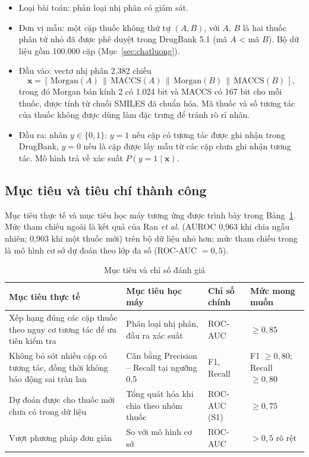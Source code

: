 \documentclass[12pt,a4paper,oneside]{report}
\begin{document}
\begin{itemize}
  \item Loại bài toán: phân loại nhị phân có giám sát.
  \item Đơn vị mẫu: một cặp thuốc không thứ tự $(A, B)$, với $A$, $B$ là hai
        thuốc phân tử nhỏ đã được phê duyệt trong DrugBank 5.1 (mã $A$ < mã $B$).
        Bộ dữ liệu gồm 100.000 cặp (Mục~\ref{sec:chatluong}).
  \item Đầu vào: vectơ nhị phân 2.382 chiều
        \[\mathbf{x} = [\,\text{Morgan}(A)\,\|\,\text{MACCS}(A)\,\|\,\text{Morgan}(B)\,\|\,\text{MACCS}(B)\,],\]
        trong đó Morgan bán kính 2 có 1.024 bit và MACCS có 167 bit cho mỗi thuốc,
        được tính từ chuỗi SMILES đã chuẩn hóa. Mã thuốc và số tương tác của
        thuốc không được dùng làm đặc trưng để tránh rò rỉ nhãn.
  \item Đầu ra: nhãn $y\in\{0,1\}$: $y=1$ nếu cặp có tương tác được ghi
        nhận trong DrugBank, $y=0$ nếu là cặp được lấy mẫu từ các cặp chưa ghi
        nhận tương tác. Mô hình trả về xác suất $P(y=1\mid\mathbf{x})$.
\end{itemize}

\subsection{Mục tiêu và tiêu chí thành công}

Mục tiêu thực tế và mục tiêu học máy tương ứng được trình bày trong
Bảng~\ref{tab:muctieu}. Mức tham chiếu ngoài là kết quả của Ran \textit{et al.}
\cite{ran2022} (AUROC 0,963 khi chia ngẫu nhiên; 0,903 khi một thuốc mới) trên
bộ dữ liệu nhỏ hơn; mức tham chiếu trong là mô hình cơ sở dự đoán theo lớp đa số
(ROC-AUC $=0{,}5$).

\begin{table}[H]
  \centering
  \caption{Mục tiêu và chỉ số đánh giá}
  \label{tab:muctieu}
  \begin{tabularx}{\textwidth}{>{\raggedright\arraybackslash}X >{\raggedright\arraybackslash}X
                               >{\centering\arraybackslash}p{2.6cm} >{\centering\arraybackslash}p{2.6cm}}
    \toprule
    \textbf{Mục tiêu thực tế} & \textbf{Mục tiêu học máy} & \textbf{Chỉ số chính} & \textbf{Mức mong muốn} \\
    \midrule
    Xếp hạng đúng các cặp thuốc theo nguy cơ tương tác để ưu tiên kiểm tra & Phân loại nhị phân, đầu ra xác suất & ROC-AUC & $\geq 0{,}85$ \\
    Không bỏ sót nhiều cặp có tương tác, đồng thời không báo động sai tràn lan & Cân bằng Precision -- Recall tại ngưỡng 0,5 & F1, Recall & F1 $\geq 0{,}80$; Recall $\geq 0{,}80$ \\
    Dự đoán được cho thuốc mới chưa có trong dữ liệu & Tổng quát hóa khi chia theo nhóm thuốc & ROC-AUC (S1) & $\geq 0{,}75$ \\
    Vượt phương pháp đơn giản & So với mô hình cơ sở & ROC-AUC & $>0{,}5$ rõ rệt \\
    \bottomrule
  \end{tabularx}
\end{table}
\end{document}
